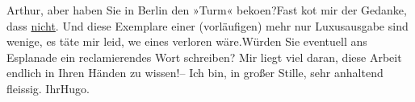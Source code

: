 \begin{ledgroupsized}[t]{13cm}
           \pstart
           Arthur, aber haben Sie in Berlin den »Turm« beko{\geminationm}en?\hspace*{1.5em}Fast ko{\geminationm}t mir der Gedanke,
               dass \uline{nicht}. Und diese Exemplare einer (vorläufigen)
               mehr nur Luxusausgabe sind wenige, es täte mir leid, we{\geminationn}
               eines verloren wäre.\hspace*{1.5em}Würden Sie eventuell ans Esplanade ein reclamierendes Wort schreiben? Mir
               liegt viel daran, diese Arbeit endlich in Ihren Händen zu wissen!\hspace*{1.5em}– Ich bin, in großer Stille, sehr anhaltend fleissig.\pend
           \pstart Ihr\spacefill\mbox{Hugo.}\pend{}
         
         \endnumbering{}\end{ledgroupsized}  \newcommand{\dateiname}{L02454}\newcommand{\titel}{Hugo Hofmannsthal an Arthur Schnitzler, 14. 11. 1925}\newcommand{\editorInnen}{Martin Anton Müller und Gerd-Hermann Susen}
      